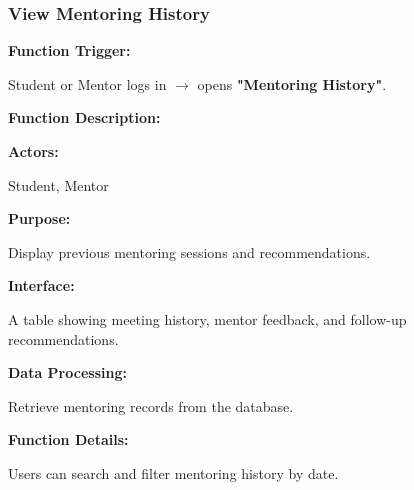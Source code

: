 %

\subsubsection{View Mentoring History}

\textbf{Function Trigger:}

Student or Mentor logs in $\rightarrow$ opens \textbf{"Mentoring History"}.

\vspace{0.3cm}

\textbf{Function Description:}

\textbf{Actors:}

Student, Mentor

\vspace{0.2cm}

\textbf{Purpose:}

Display previous mentoring sessions and recommendations.

\vspace{0.2cm}

\textbf{Interface:}

A table showing meeting history, mentor feedback, and follow-up recommendations.

\vspace{0.2cm}

\textbf{Data Processing:}

Retrieve mentoring records from the database.

\vspace{0.3cm}

\textbf{Function Details:}

Users can search and filter mentoring history by date.

%

